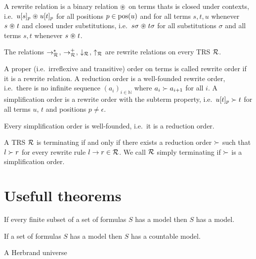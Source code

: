 \begin{definition}\label{def:closed-under}
	A {\myem rewrite relation} is a binary relation $\mathrel{\circledast}$ on terms thats is {\myem closed under contexts},
	i.e.~$u[s]_p\mathrel{\circledast} u[t]_p$ %
	for all positions $p\in\operatorname{pos}(u)$ and
	for all terms $s,t,u$ whenever $s\mathrel{\circledast} t$
	and {\myem closed under substitutions}, 
	i.e.~$s\sigma\mathrel{\circledast} t\sigma$ %
	for all substitutions $\sigma$
	and all terms $s,t$ whenever $s\mathrel{\circledast} t$.
\end{definition}
\begin{lemma}
	The relations $\rightarrow^*_{\mathcal R}$, 
	$\rightarrow^+_{\mathcal R}$,
	$\downarrow_{\mathcal R}$, $\uparrow_{\mathcal R}$ are rewrite relations on every TRS ${\mathcal R}$.
\end{lemma}
%
\begin{definition}
	A proper (i.e.~irreflexive and transitive) order on terms is called {\myem rewrite order} if it is a rewrite relation.
	A {\myem reduction order} is a well-founded rewrite order,
	i.e.~there is no infinite sequence 
	$(a_i)_{i\in\mathbb{N}}$
	where $a_i\succ a_{i+1}$ for all $i$.
	A {\myem simplification order} is a rewrite order with the {\myem subterm property},
	i.e.~$u[t]_p \succ t$ for all terms $u$, $t$ and positions $p\neq\epsilon$.
\end{definition}
\begin{lemma}
	Every simplification order is well-founded, i.e.~it is a reduction order.
\end{lemma}
%
\begin{theorem}
	A TRS ${\mathcal R}$ is terminating if and only if there exists a reduction order $\succ$
	such that $l\succ r$ for every rewrite rule $l\rightarrow r\in{\mathcal R}$.
	We call ${\mathcal R}$ simply terminating if $\succ$ is a simplification order.
\end{theorem}

\section{Usefull theorems}

\begin{theorem}[Compactness]
	If every finite subset of a set of formulas $S$ has a model then $S$ has a model. 
\end{theorem}

\begin{theorem}
	If a set of formulas $S$ has a model then $S$ has a countable model.
\end{theorem}

\begin{definition}
A Herbrand universe 
\end{definition}

\begin{definition}
	
\end{definition}


